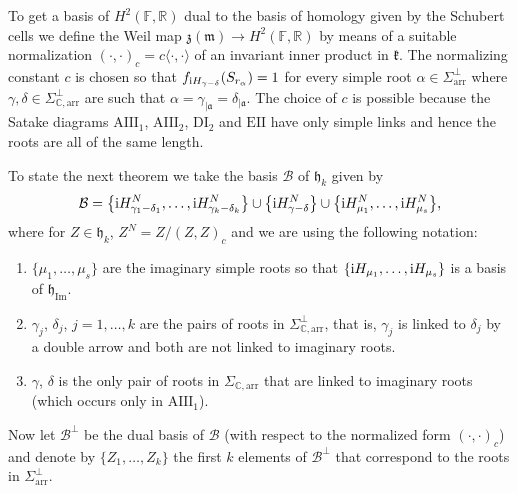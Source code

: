 \documentclass[pdftex]{sigma}
\numberwithin{equation}{section}
\newcommand{\func}[1]{\operatorname{#1}}
\begin{document}
To get a basis of $H^{2}(\mathbb{F},\mathbb{R}) $ dual to the basis of homology given by the Schubert cells we define the Weil map $\mathfrak{z}(\mathfrak{m}) \rightarrow H^{2}( \mathbb{F},\mathbb{R}) $ by means of a suitable normalization $ ( \cdot,\cdot ) _{c}=c\langle \cdot,\cdot \rangle $ of an invariant inner product in $\mathfrak{k}$. The normalizing constant $c$ is chosen so that $f_{{\rm i}H_{\gamma -\delta }} ( S_{r_{\alpha }} ) =1$ for every simple root $\alpha \in \Sigma _{\mathrm{arr}}^{\bot }$ where $\gamma,\delta \in \Sigma _{\mathbb{C},\mathrm{arr}}^{\bot }$ are such that $\alpha =\gamma _{\vert \mathfrak{a} }=\delta _{\vert \mathfrak{a}}$. The choice of $c$ is possible because the Satake diagrams $\mathrm{AIII}_{1}$, $\mathrm{AIII}_{2}$, $\mathrm{DI}_{2}$ and $\mathrm{EII}$ have only simple links and hence the roots are all of the same length.

To state the next theorem we take the basis $\mathcal{B}$ of $\mathfrak{h}_{k}$ given by
\begin{gather*}
\mathcal{B}=\big\{{\rm i}H_{\gamma _{1}-\delta _{1}}^{N},\ldots,{\rm i}H_{\gamma _{k}-\delta _{k}}^{N}\big\}\cup \big\{{\rm i}H_{\gamma -\delta }^{N}\big\}\cup \big\{{\rm i}H_{\mu_{1}}^{N},\ldots,{\rm i}H_{\mu _{s}}^{N}\big\},
\end{gather*}
where for $Z\in \mathfrak{h}_{k}$, $Z^{N}=Z/(Z,Z) _{c}$ and we are using the following notation:
\begin{enumerate}\itemsep=0pt
\item $\{\mu _{1},\ldots,\mu _{s}\}$ are the imaginary simple roots so that $\{{\rm i}H_{\mu _{1}},\ldots,{\rm i}H_{\mu _{s}}\}$ is a basis of $\mathfrak{h}_{\func{Im}}$.

\item $\gamma _{j}$, $\delta _{j}$, $j=1,\ldots,k$ are the pairs of roots in $\Sigma _{\mathbb{C},\mathrm{arr}}^{\bot }$, that is, $\gamma _{j}$ is linked to $\delta _{j}$ by a double arrow and both are not linked to imaginary
roots.

\item $\gamma$, $\delta $ is the only pair of roots in $\Sigma _{\mathbb{C},\mathrm{arr}}$ that are linked to imaginary roots (which occurs only in $\mathrm{AIII}_{1}$).
\end{enumerate}

Now let $\mathcal{B}^{\bot }$ be the dual basis of $\mathcal{B}$ (with
respect to the normalized form $(\cdot,\cdot) _{c}$) and
denote by $\{Z_{1},\ldots,Z_{k}\}$ the first $k$ elements of $\mathcal{B}%
^{\bot }$ that correspond to the roots in $\Sigma _{\mathrm{arr}}^{\bot }$.
\end{document}
